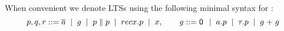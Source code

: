


When convenient we denote LTSs using the following minimal syntax for \ACCS:
\begin{equation}
  \label{eq:syntax-processes}
    p,q,r ::= 
\out{\aa}
\BNFsep g
\BNFsep p \Par p
 \BNFsep \rec{p}
 \BNFsep x,
\qquad
 g ::= 
 \Nil
 \BNFsep a.p
 \BNFsep \tau.p
 \BNFsep g \extc g
\end{equation}

